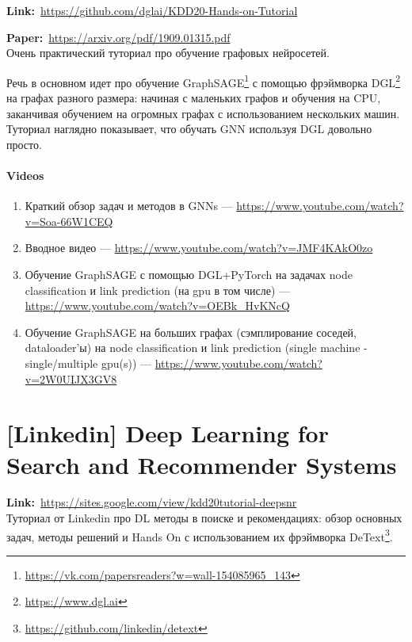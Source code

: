 \textbf{Link:}~\url{https://github.com/dglai/KDD20-Hands-on-Tutorial}

\textbf{Paper:}~\url{https://arxiv.org/pdf/1909.01315.pdf} \\

Очень практический туториал про обучение графовых нейросетей. 

Речь в основном идет про обучение GraphSAGE\footnote{\url{https://vk.com/papersreaders?w=wall-154085965_143}} с помощью фрэймворка DGL\footnote{\url{https://www.dgl.ai}} на графах разного размера: начиная с маленьких графов и обучения на CPU, заканчивая обучением на огромных графах с использованием нескольких машин. \\

Туториал наглядно показывает, что обучать GNN используя DGL довольно просто.

\paragraph{Videos}

\begin{enumerate}
    \item Краткий обзор задач и методов в GNNs --- \url{https://www.youtube.com/watch?v=Soa-66W1CEQ}
    \item Вводное видео --- \url{https://www.youtube.com/watch?v=JMF4KAkO0zo}
    \item Обучение GraphSAGE с помощью DGL+PyTorch на задачах node classification и link prediction (на gpu в том числе) --- \url{https://www.youtube.com/watch?v=OEBk_HvKNcQ}
    \item Обучение GraphSAGE на больших графах (сэмплирование соседей, dataloader'ы) на node classification и link prediction (single machine - single/multiple gpu(s)) --- \url{https://www.youtube.com/watch?v=2W0UIJX3GV8}
\end{enumerate}


\section{[Linkedin] Deep Learning for Search and Recommender Systems} 

\textbf{Link:}~\url{https://sites.google.com/view/kdd20tutorial-deepsnr} \\

Туториал от Linkedin про DL методы в поиске и рекомендациях: обзор основных задач, методы решений и Hands On с использованием их фрэймворка DeText\footnote{\url{https://github.com/linkedin/detext}}.

